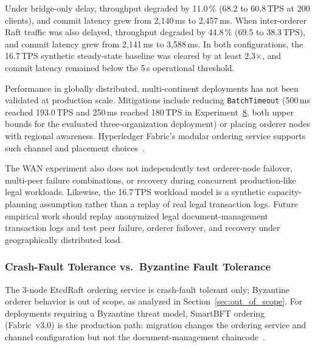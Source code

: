 \documentclass[preprint,12pt]{elsarticle}
\begin{document}
Under bridge-only delay, throughput degraded by 11.0\,\% (68.2 to
60.8\,TPS at 200 clients), and commit latency grew from 2,140\,ms to
2,457\,ms. When inter-orderer Raft traffic was also delayed, throughput
degraded by 44.8\,\% (69.5 to 38.3\,TPS), and commit latency grew from
2,141\,ms to 3,588\,ms. In both configurations, the 16.7\,TPS synthetic
steady-state baseline was cleared by at least 2.3$\times$, and commit
latency remained below the 5\,s operational threshold.

Performance in globally distributed, multi-continent deployments has not
been validated at production scale. Mitigations include reducing
\texttt{BatchTimeout} (500\,ms reached 193.0\,TPS and 250\,ms reached
180\,TPS in Experiment~\hyperref[sec:exp_sensitivity]{8}, both upper bounds for the evaluated
three-organization deployment) or placing orderer nodes with regional
awareness. Hyperledger Fabric's modular ordering service supports such
channel and placement choices~\cite{hyperledgerFabricOrderingService_v24,woznica2022}.

The WAN experiment also does not independently test orderer-node failover,
multi-peer failure combinations, or recovery during concurrent production-like
legal workloads. Likewise, the 16.7\,TPS workload model is a synthetic
capacity-planning assumption rather than a replay of real legal transaction
logs. Future empirical work should replay anonymized legal document-management
transaction logs and test peer failure, orderer failover, and recovery under
geographically distributed load.


\subsubsection{Crash-Fault Tolerance vs.\ Byzantine Fault Tolerance}
The 3-node EtcdRaft ordering service is crash-fault tolerant only;
Byzantine orderer behavior is out of scope, as analyzed in
Section~\ref{sec:out_of_scope}. For deployments requiring a Byzantine
threat model, SmartBFT ordering (Fabric~v3.0) is the production path:
migration changes the ordering service and channel configuration but
not the document-management
chaincode~\cite{fabricWhatsNew3x,fabricOrderingServiceLatest,fabricBFTConfigurationDoc}.
\end{document}
